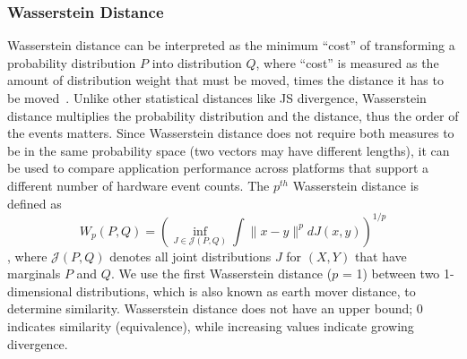 \subsubsection{Wasserstein Distance}
\label{sec:wass}
Wasserstein distance\cite{rubner2000earth} can be interpreted as the minimum ``cost'' of transforming a probability distribution $P$ into distribution $Q$, where ``cost'' is measured as the amount of distribution weight that must be moved, times the distance it has to be moved~\cite{wassersteinscipy}. 
Unlike other statistical distances like JS divergence, Wasserstein distance multiplies the probability distribution and the distance, thus the order of the events matters. 
Since Wasserstein distance does not require both measures to be in the same probability space (\ie two vectors may have different lengths), it can be used to compare application performance across platforms that support a different number of hardware event counts. The $p^{th}$ Wasserstein distance is defined as 
\begin{equation}
W_{p}(P, Q)=\left(\inf _{J \in \mathcal{J}(P, Q)} \int\|x-y\|^{p} d J(x, y)\right)^{1 / p}
\end{equation},
where $\mathcal{J}(P, Q)$ denotes all joint distributions $J$ for $(X,Y)$ that have marginals $P$ and $Q$. 
We use the first Wasserstein distance ($p$ = 1) between two 1-dimensional distributions, which is also known as earth mover distance, to determine similarity. Wasserstein distance does not have an upper bound; 0 indicates similarity (equivalence), while increasing values indicate growing divergence. 

